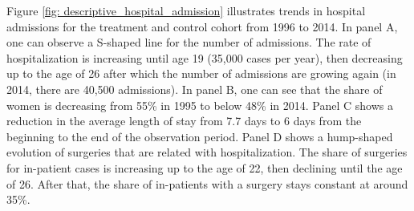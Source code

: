 \documentclass[11pt, a4paper,draft]{article} %
\begin{document}
Figure \ref{fig: descriptive_hospital_admission} illustrates trends in hospital admissions for the treatment and control cohort from 1996 to 2014. In panel A, one can observe a S-shaped line for the number of admissions. The rate of hospitalization is increasing until age 19 (35,000 cases per year), then decreasing up to the age of 26 after which the number of admissions are growing again (in 2014, there are 40,500 admissions). In panel B, one can see that the share of women is decreasing from 55\% in 1995 to below 48\% in 2014. Panel C shows a reduction in the average length of stay from 7.7 days to 6 days from the beginning to the end of the observation period. Panel D shows a hump-shaped evolution of surgeries that are related with hospitalization. The share of surgeries for in-patient cases is increasing up to the age of 22, then declining until the age of 26. After that, the share of in-patients with a surgery stays constant at around 35\%.\newline %
\end{document}
